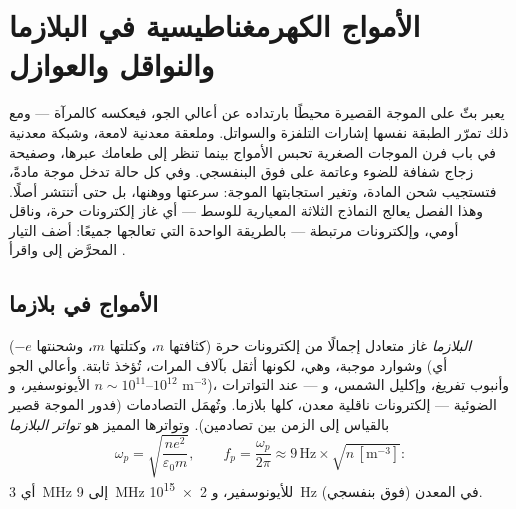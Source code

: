 \chapter{الأمواج الكهرمغناطيسية في البلازما والنواقل والعوازل}\label{ch:b2:waves-in-media}

يعبر بثّ على الموجة القصيرة محيطًا بارتداده عن أعالي
الجو، فيعكسه كالمرآة --- ومع ذلك تمرّر الطبقة نفسها
إشارات التلفزة والسواتل. وملعقة معدنية لامعة،
وشبكة معدنية في باب فرن الموجات الصغرية تحبس الأمواج بينما
تنظر إلى طعامك عبرها، وصفيحة زجاج شفافة
للضوء وعاتمة على فوق البنفسجي. وفي كل حالة تدخل موجة
مادةً، فتستجيب شحن المادة، وتغير استجابتها
الموجة: سرعتها ووهنها، بل حتى أتنتشر
أصلًا. وهذا الفصل يعالج النماذج الثلاثة المعيارية للوسط --- أي
غاز إلكترونات حرة، وناقل أومي، وإلكترونات مرتبطة --- بالطريقة
الواحدة التي تعالجها جميعًا: أضف التيار المحرَّض إلى
 واقرأ .

\section{الأمواج في بلازما}

\begin{definition}\label{def:b2:waves-in-media:plasma}
\emph{البلازما} غاز متعادل إجمالًا من إلكترونات حرة (كثافتها
$n$، وكتلتها $m$، وشحنتها $-e$) وشوارد موجبة، وهي، لكونها أثقل
بآلاف المرات، تُؤخذ ثابتة. وأعالي الجو (أي الأيونوسفير،
و $n \sim 10^{11}$--$10^{12}$ m$^{-3}$)، وأنبوب تفريغ، وإكليل الشمس،
و --- عند التواترات الضوئية --- إلكترونات ناقلية معدن،
كلها بلازما. وتُهمَل التصادمات (فدور الموجة قصير
بالقياس إلى الزمن بين تصادمين). وتواترها المميز
هو \emph{تواتر البلازما}
\[
\omega_p = \sqrt{\frac{ne^2}{\varepsilon_0m}} , \qquad
f_p = \frac{\omega_p}{2\pi} \approx 9\,\text{Hz}\times\sqrt{n\,[\text{m}^{-3}]} :
\]
أي \qty{3}{MHz} إلى \qty{9}{MHz} للأيونوسفير، و \qty{2e15}{Hz} (فوق بنفسجي) في
المعدن.
\end{definition}

